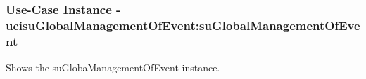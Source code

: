 
	\subsubsection{Use-Case Instance - ucisuGlobalManagementOfEvent:suGlobalManagementOfEvent}
	
	Shows the suGlobaManagementOfEvent instance.		  
	\begin{operationmodel}
	
	\end{operationmodel} 

	
